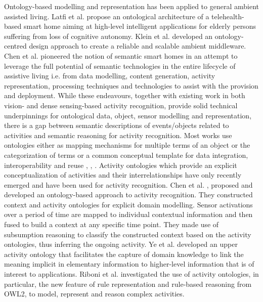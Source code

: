 Ontology-based modelling and representation has been applied to general ambient assisted living. Latfi et al. \cite{Latfi2007} propose an ontological architecture of a telehealth-based smart home aiming at high-level intelligent applications for elderly persons suffering from loss of cognitive autonomy. Klein et al. \cite{Klein2007} developed an ontology-centred design approach to create a reliable and scalable ambient middleware. Chen et al. \cite{Chen2009} pioneered the notion of semantic smart homes in an attempt to leverage the full potential of semantic technologies in the entire lifecycle of assistive living i.e. from data modelling, content generation, activity representation, processing techniques and technologies to assist with the provision and deployment. While these endeavours, together with existing work in both vision- and dense sensing-based activity recognition, provide solid technical underpinnings for ontological data, object, sensor modelling and representation, there is a gap between semantic descriptions of events/objects related to activities and semantic reasoning for activity recognition. Most works use ontologies either as mapping mechanisms for multiple terms of an object \cite{Tapia2006} or the categorization of terms \cite{Yamada2007} or a common conceptual template for data integration, interoperability and reuse \cite{Latfi2007}, \cite{Klein2007}, \cite{Chen2009}. Activity ontologies which provide an explicit conceptualization of activities and their interrelationships have only recently emerged and have been used for activity recognition. Chen et al. \cite{Chen2009b}, \cite{Chen2012a} proposed and developed an ontology-based approach to activity recognition. They constructed context and activity ontologies for explicit domain modelling. Sensor activations over a period of time are mapped to individual contextual information and then fused to build a context at any specific time point. They made use of subsumption reasoning to classify the constructed context based on the activity ontologies, thus inferring the ongoing activity. Ye et al. \cite{Ye2011} developed an upper activity ontology that facilitates the capture of domain knowledge to link the meaning implicit in elementary information to higher-level information that is of interest to applications. Riboni et al. \cite{Riboni2011b} investigated the use of activity ontologies, in particular, the new feature of rule representation and rule-based reasoning from OWL2, to model, represent and reason complex activities.

